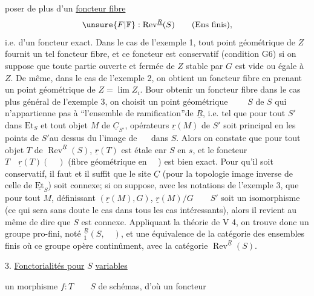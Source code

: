 %
poser de plus d'un \uline{foncteur fibre}
\[
\unsure{F|\mathbb{F}}:\operatorname{Rev}^{\underline{R}}(S)\qquad(\mathrm{Ens\ finis}),
\]
i.e. d'un foncteur exact. Dans le cas de l'exemple 1, tout point géométrique de $Z$ fournit un tel foncteur fibre, et ce foncteur est conservatif (condition G6) si on suppose que toute partie ouverte et fermée de $Z$ stable par $G$ est vide ou égale à $Z$. De même, dans le cas de l'exemple 2, on obtient un  foncteur fibre en prenant un point géométrique de $Z=\lim Z_i$. Bour obtenir un foncteur fibre dans le cas plus général de l'exemple 3, on choisit un point géométrique $\qquad S$ de $S$  qui n'appartienne pas à ``l'ensemble de ramification''de $\underline{R}$, i.e. tel que pour tout $S'$ dans $\mathrm{Et}_S$ et tout objet $M$ de $\underline{C}_{S'}$,     opérateurs $\underline{r}(M)$  de $S'$ soit principal en les points de $S'$au dessus du l'image  de $\quad$ dans $S$. Alors   on constate que pour tout objet $T$ de $\operatorname{Rev}^{\underline{R}}(S)$, $\underline{r}(T)$ est étale enr $S$ en $s$, et le foncteur $T\quad\underline{r}(T)(\quad)$ (fibre géométrique en $\quad$) est bien exact. Pour qu'il soit conservatif, il faut et il suffit que le site $\underline{C}$ (pour la topologie image inverse de celle de $\underline{\mathrm{Et}}_S$) soit connexe;  si on suppose, avec les notations de l'exemple 3, que pour tout $M$, définissant $(\underline{r}(M),G)$, $\underline{r}(M)/G\qquad S'$ soit un isomorphisme (ce qui sera sans doute le cas dans tous les cas intéressants), alors il revient au même de dire que $S$ est connexe. Appliquant la théorie de V 4, on trouve donc un groupe pro-fini, noté ${}^{\underline{R}}_1(S,\quad)$,  et une équivalence de la catégorie des ensembles finis où ce groupe opère continûment, avec la catégorie $\operatorname{Rev}^{\underline{R}}(S)$.

3. \uline{Fonctorialités pour} $S$  \uline{variables}

 un morphisme $f:T\qquad S$ de schémas, d'où un foncteur
